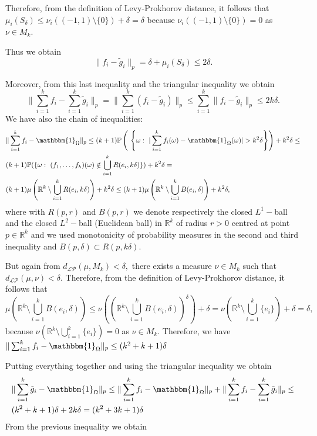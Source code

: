 \documentclass[11pt]{article}
\def\R{\mathbb{R}}
\def\P{\mathbb{P}}
\renewcommand{\P}{\mathbb{P}}
\begin{document}
Therefore, from the definition of Levy-Prokhorov distance, it follows that $\mu_i(S_{\delta})\leq \nu_i((-1,1)\setminus \{0\})+\delta=\delta$ because $\nu_i((-1,1)\setminus \{0\})=0$ as $\nu\in M_k.$

Thus we obtain 
$$\|f_i-\tilde{g}_i\|_p=\delta+\mu_i(S_{\delta})\leq 2 \delta.$$

Moreover, from this last inequality and the triangular inequality we obtain $$\|\sum^k_{i=1}f_i-\sum^k_{i=1}\tilde{g}_i\|_p=\|\sum^k_{i=1}(f_i-\tilde{g}_i)\|_p\leq\sum^k_{i=1}\|f_i-\tilde{g}_i\|_p\leq 2k \delta.$$
We have also the chain of inequalities: $$\begin{aligned}
   & \|\sum^k_{i=1}f_i-\mathbbm{1}_{\Omega}\|_p\leq (k+1) \P\left(\ \left\{\omega: \ |\sum^k_{i=1}f_i(\omega)-\mathbbm{1}_{\Omega}(\omega)|>k^2\delta\right\}\right)+k^2\delta\leq\\
   &(k+1)\P(\{\omega:\ (f_1 ,\ldots ,f_k)(\omega)\notin \bigcup^k_{i=1} R(e_i,k\delta) \})+k^2\delta=\\
   &(k+1)\mu\left(\R^k\setminus\bigcup^k_{i=1} R(e_i,k\delta) \right)+k^2\delta\leq (k+1)\mu\left(\R^k\setminus\bigcup^k_{i=1} B(e_i,\delta)\right)+k^2\delta ,
   \end{aligned}$$
where with $R(p,r)$ and $B(p,r)$ we denote respectively the closed $L^1-$ball and the closed $L^2-$ball (Euclidean ball) in $\R^k$ of radius $r>0$ centred at point $p\in \R^k$ and we used monotonicity of probability measures in the second and third inequality and $B(p,\delta)\subset R(p,k\delta)$.

But again from $d_{\mathcal{LP}}(\mu, M_k)<\delta,$ there exists a measure $\nu \in M_k$ such that $d_{\mathcal{LP}}(\mu, \nu)< \delta.$ Therefore, from the definition of Levy-Prokhorov distance, it follows that $$
\mu\left(\R^k\setminus\bigcup^k_{i=1} B(e_i,\delta)\right)\leq\nu\left(\left(\R^k\setminus\bigcup^k_{i=1} B(e_i,\delta)\right)^{\delta}\right)+\delta=\nu\left(\R^k\setminus\bigcup^k_{i=1} \{e_i\}\right)+\delta=\delta,
$$
because $\nu\left(\R^k\setminus\bigcup^k_{i=1} \{e_i\}\right)=0$ as $\nu\in M_k.$ Therefore, we have $
\|\sum^k_{i=1}f_i-\mathbbm{1}_{\Omega}\|_p\leq (k^2+k+1)\delta
$

Putting everything together and using the triangular inequality we obtain 
$$\begin{aligned}   
   &\|\sum^k_{i=1}\tilde{g}_i-\mathbbm{1}_{\Omega}\|_p\leq \|\sum^k_{i=1}f_i-\mathbbm{1}_{\Omega}\|_p+\|\sum^k_{i=1}f_i-\sum^k_{i=1}\tilde{g}_i\|_p\leq \\
   &(k^2+k+1)\delta +2k\delta=(k^2+3k+1)\delta
   \end{aligned}$$
From the previous inequality we obtain 
\end{document}
